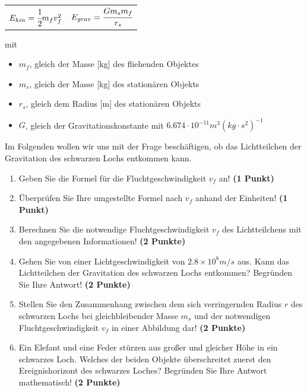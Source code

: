 \documentclass[a4paper, 9pt]{scrartcl}\usepackage[]{graphicx}\usepackage[]{xcolor}
\begin{document}
\begin{center}
  \begin{tabular}{cc}
    $E_{kin} = \cfrac{1}{2}m_fv_f^2$ & $E_{grav} = \cfrac{Gm_sm_f}{r_s}$\\
  \end{tabular}
\end{center}

mit

\begin{itemize}[noitemsep]
\item $m_f$, gleich der Masse [kg] des fliehenden Objektes
\item $m_s$, gleich der Masse [kg] des station{\"a}ren Objekts
\item $r_s$, gleich dem Radius [m] des station{\"a}ren Objekts  
\item $G$, gleich der Gravitationskonstante mit $6.674 \cdot 10^{-11}
  m^3(kg \cdot s^2)^{-1}$ 
\end{itemize}

Im Folgenden wollen wir uns mit der Frage besch{\"a}ftigen, ob das
Lichtteilchen der Gravitation des schwarzen Lochs entkommen kann.

\begin{enumerate}
\item Geben Sie die Formel f{\"u}r die Fluchtgeschwindigkeit $v_f$ an! 
  \textbf{(1 Punkt)}
\item {\"U}berpr{\"u}fen Sie Ihre umgestellte Formel nach $v_f$ anhand der Einheiten!
  \textbf{(1 Punkt)} 
\item Berechnen Sie die notwendige Fluchtgeschwindigkeit $v_f$ des
  Lichtteilchens mit den angegebenen Informationen! \textbf{(2 Punkte)}
\item Gehen Sie von einer Lichtgeschwindigkeit von $\ensuremath{2.8\times 10^{8}}m/s$
  aus. Kann das Lichtteilchen der Gravitation des schwarzen Lochs
  entkommen? Begr{\"u}nden Sie Ihre Antwort! \textbf{(2 Punkte)}
\item Stellen Sie den Zusammenhang zwischen dem sich verringernden Radius
  $r$ des schwarzen Lochs bei gleichbleibender Masse $m_s$
  und der notwendigen Fluchtgeschwindigkeit $v_f$ in einer Abbildung dar!
  \textbf{(2 Punkte)}
 \item Ein Elefant und eine Feder st{\"u}rzen aus gro{\ss}er und gleicher H{\"o}he
  in ein schwarzes Loch. Welches der beiden Objekte {\"u}berschreitet zuerst
  den Ereignishorizont des schwarzes Loches? Begr{\"u}nden
  Sie Ihre Antwort mathematisch! \textbf{(2 Punkte)}  
\end{enumerate}
\end{document}

